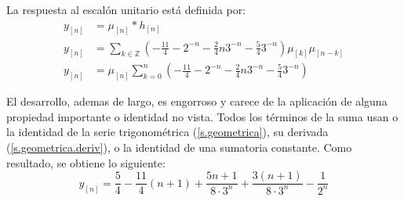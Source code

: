 \documentclass[a4paper,12pt]{report}
\begin{document}
\begin{enumerate}[label=\alph*), left=0pt]
    La respuesta al escalón unitario está definida por:
    \begin{align*}
      y_{[n]} &= \mu_{[n]} * h_{[n]}\\[6pt]
      y_{[n]} &= \sum_{k \in \mathbb{Z}} \left(-\frac{11}{4} - 2^{-n} - \frac{2}{4} n 3^{-n} - \frac{5}{4} 3^{-n}\right) \mu_{[k]} \mu_{[n-k]}\\
      y_{[n]} &= \mu_{[n]} \sum_{k=0}^n \left(-\frac{11}{4} - 2^{-n} - \frac{2}{4} n 3^{-n} - \frac{5}{4} 3^{-n}\right)
    \end{align*}


    El desarrollo, ademas de largo, es engorroso y carece de la aplicación de alguna propiedad importante o identidad
    no vista. Todos los términos de la suma usan o la identidad de la serie trigonométrica (\ref{s.geometrica}), su
    derivada (\ref{s.geometrica.deriv}), o la identidad de una sumatoria constante. Como resultado, se obtiene lo
    siguiente:
    \begin{equation*}
      y_{[n]} = \frac{5}{4} - \frac{11}{4} (n+1) + \frac{5n + 1}{8 \cdot 3^n} + \frac{3 (n+1)}{8 \cdot 3^n} -
        \frac{1}{2^n}
    \end{equation*}


\end{enumerate}
\end{document}
